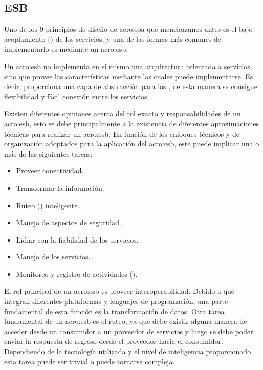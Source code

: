 
\subsection{ESB}
\label{esb:introduccion}


Uno de los 9 principios de diseño de \gls{acro:soa} que mencionamos antes es el bajo acoplamiento () de los servicios, y una de las formas más comunes de implementarlo es mediante un \gls{acro:esb}.

Un \gls{acro:esb} no implementa en sí mismo una arquitectura orientada a servicios, sino que provee las características mediante las cuales puede implementarse. Es decir, proporciona una capa de abstracción para los , de esta manera se consigue flexibilidad y fácil conexión entre los servicios.

Existen diferentes opiniones acerca del rol exacto y responsabilidades de un \gls{acro:esb}, esto se debe principalmente a la existencia de diferentes aproximaciones técnicas para realizar un \gls{acro:esb}\cite[p.~47]{josuttis2007}.  En función de los enfoques técnicos y de organización adoptados para la aplicación del \gls{acro:esb}, este puede implicar una o más de las siguientes tareas:

\begin{itemize}
  \item Proveer conectividad.
  \item Transformar la información.
  \item Ruteo () inteligente.
  \item Manejo de aspectos de seguridad.
  \item Lidiar con la fiabilidad de los servicios.
  \item Manejo de los servicios.
  \item Monitoreo y registro de actividades ().
\end{itemize}

El rol principal de un \gls{acro:esb} es proveer interoperabilidad. Debido a que integran diferentes plataformas y lenguajes de programación, una parte fundamental de esta función es la transformación de datos.
Otra tarea fundamental de un \gls{acro:esb} es el ruteo, ya que debe existir alguna manera de acceder desde un consumidor a un proveedor de servicios y luego se debe poder enviar la respuesta de regreso desde el proveedor hacia el consumidor. Dependiendo de la tecnología utilizada y el nivel de inteligencia proporcionado, esta tarea puede ser trivial o puede tornarse compleja.

